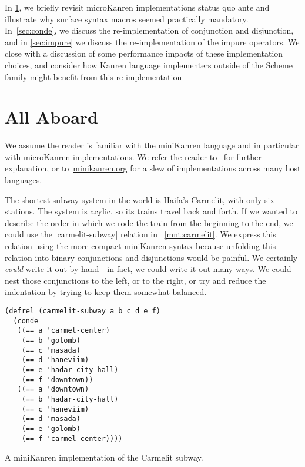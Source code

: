 \documentclass[sigplan,screen,draft,anonymous,review,natbib=false]{acmart}
\begin{document}
In \cref{sec:all-aboard}, we briefly revisit microKanren implementations
status quo ante and illustrate why surface syntax macros seemed
practically mandatory. In~\cref{sec:conde}, we discuss the
re-implementation of conjunction and disjunction, and in
\cref{sec:impure} we discuss the re-implementation of the impure
operators. We close with a discussion of some performance impacts of
these implementation choices, and consider how Kanren language
implementers outside of the Scheme family might benefit from this
re-implementation

\section{All Aboard}\label{sec:all-aboard}

We assume the reader is familiar with the miniKanren language and in
particular with microKanren implementations. We refer the reader
to~\cite{friedman2018reasoned,hemann2013muKanren,hemann2016small} for
further explanation, or to~\href{minikanren.org}{minikanren.org} for a
slew of implementations across many host languages.

The shortest subway system in the world is Haifa's Carmelit, with only
six stations. The system is acylic, so its trains travel back and
forth. If we wanted to describe the order in which we rode the train
from the beginning to the end, we could use the
\rackinline|carmelit-subway| relation in ~\cref{mnt:carmelit}. We
express this relation using the more compact miniKanren syntax because
unfolding this relation into binary conjunctions and disjunctions
would be painful. We certainly \emph{could} write it out by hand---in
fact, we could write it out many ways. We could nest those
conjunctions to the left, or to the right, or try and reduce the
indentation by trying to keep them somewhat balanced.

\begin{listing}
  \begin{verbatim}
(defrel (carmelit-subway a b c d e f)
  (conde
   ((== a 'carmel-center)
    (== b 'golomb)
    (== c 'masada)
    (== d 'haneviim)
    (== e 'hadar-city-hall)
    (== f 'downtown))
   ((== a 'downtown)
    (== b 'hadar-city-hall)
    (== c 'haneviim)
    (== d 'masada)
    (== e 'golomb)
    (== f 'carmel-center))))
  \end{verbatim}
  \caption{A miniKanren implementation of the Carmelit subway.}
  \label{mnt:carmelit}
\end{listing}
\end{document}

